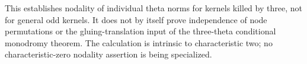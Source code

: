 \begin{remark}[Scope]
\label{rem:nonordinary-three-torsion-triple-scope-candidate}
This establishes nodality of individual theta norms for kernels killed
by three, not for general odd kernels. It does not by itself prove
independence of node permutations or the gluing-translation input of the three-theta
conditional monodromy theorem. The calculation is intrinsic to
characteristic two; no characteristic-zero nodality assertion is
being specialized.
\end{remark}
